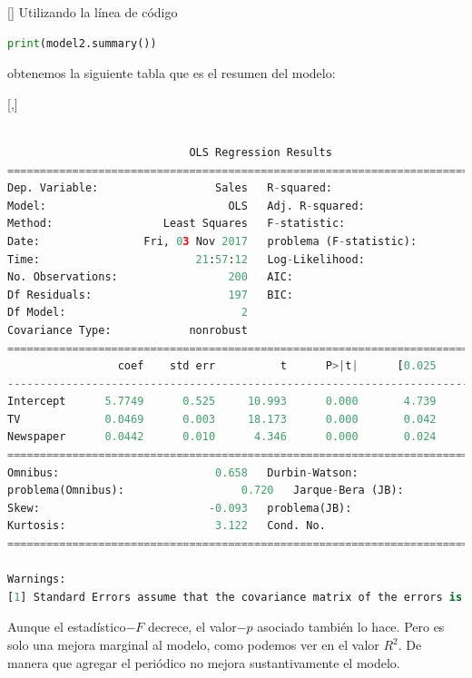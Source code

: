 []
Utilizando la línea de código
\begin{lstlisting}[language=Python]
 print(model2.summary())
\end{lstlisting} obtenemos la siguiente tabla que es el resumen del modelo:


[,]{} \tiny
\begin{lstlisting}[language=Python]

                            OLS Regression Results
==============================================================================
Dep. Variable:                  Sales   R-squared:                       0.646
Model:                            OLS   Adj. R-squared:                  0.642
Method:                 Least Squares   F-statistic:                     179.6
Date:                Fri, 03 Nov 2017   problema (F-statistic):           3.95e-45
Time:                        21:57:12   Log-Likelihood:                -509.89
No. Observations:                 200   AIC:                             1026.
Df Residuals:                     197   BIC:                             1036.
Df Model:                           2
Covariance Type:            nonrobust
==============================================================================
                 coef    std err          t      P>|t|      [0.025      0.975]
------------------------------------------------------------------------------
Intercept      5.7749      0.525     10.993      0.000       4.739       6.811
TV             0.0469      0.003     18.173      0.000       0.042       0.052
Newspaper      0.0442      0.010      4.346      0.000       0.024       0.064
==============================================================================
Omnibus:                        0.658   Durbin-Watson:                   1.969
problema(Omnibus):                  0.720   Jarque-Bera (JB):                0.415
Skew:                          -0.093   problema(JB):                        0.813
Kurtosis:                       3.122   Cond. No.                         410.
==============================================================================

Warnings:
[1] Standard Errors assume that the covariance matrix of the errors is correctly specified.
\end{lstlisting}


Aunque el estadístico$-F$ decrece, el valor$-p$ asociado también lo hace. Pero es solo una mejora marginal al modelo, como podemos ver en el valor $R^{2}.$ De manera que agregar el periódico no mejora sustantivamente el modelo.

